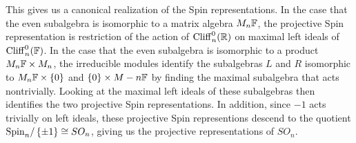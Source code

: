 This gives us a canonical realization of the Spin representations. In the
case that the even subalgebra is isomorphic to a matrix algebra $M_n\mathbb{F}$,
the projective Spin representation is restriction of the action of
$\operatorname{Cliff}_n^0(\mathbb{R})$ on maximal left ideals of $\operatorname{Cliff}_n^0(\mathbb{F})$. In the case
that the even subalgebra is isomorphic to a product $M_n\mathbb{F} \times M_n$,
the irreducible modules identify the subalgebras $L$ and $R$
isomorphic to $M_n\mathbb{F} \times \left\lbrace 0 \right\rbrace$ and $\left\lbrace 0 \right\rbrace \times M-n\mathbb{F}$ by finding the
maximal subalgebra that acts nontrivially. Looking at the maximal left ideals
of these subalgebras then identifies the two projective Spin representations.
In addition, since $-1$ acts trivially on left ideals, these projective
Spin representions descend to the quotient $\mathrm{Spin}_n / \left\lbrace \pm 1 \right\rbrace \cong SO_n$,
giving us the projective representations of $SO_n$.
%
